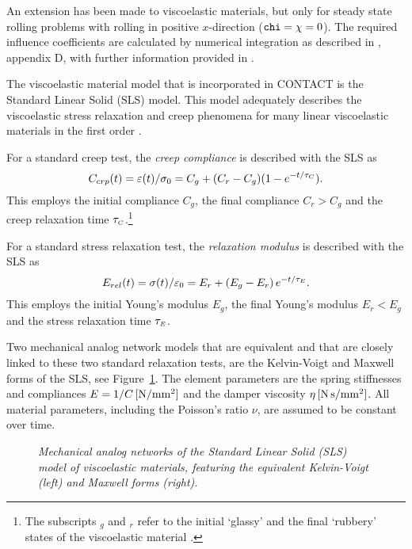 \documentclass[12pt]{report}
\begin{document}
An extension has been made to viscoelastic materials, but only for steady
state rolling problems with rolling in positive $x$-direction (${\tt chi}=
\chi=0$).  The required influence coefficients are calculated
by numerical integration as described in \cite{Kalker1990}, appendix D,
with further information provided in \cite{Wang_guangqiu1992b,
Wang_guangqiu1993}.

The viscoelastic material model that is incorporated in CONTACT is the
Standard Linear Solid (SLS) model. This model adequately describes the
viscoelastic stress relaxation and creep phenomena for many linear
viscoelastic materials in the first order \cite{Roylance2001}.

For a standard creep test, the {\em creep compliance\/} is described with
the SLS as
\begin{equation}
\label{eq:SLS_creep_compliance}
  C_{crp}(t) = \varepsilon(t)/\sigma_0 = C_g + (C_r-C_g) (1 - e^{-t/\tau_{\scriptscriptstyle C}}) .
\end{equation}
This employs the initial compliance $C_g$, the final compliance $C_r>C_g$
and the creep relaxation time $\tau_{\scriptscriptstyle C}$.\footnote{The subscripts $_g$ and
$_r$ refer to the initial `glassy' and the final `rubbery' states of
the viscoelastic material \cite{Roylance2001}.}

For a standard stress relaxation test, the {\em relaxation modulus\/} is
described with the SLS as
\begin{equation}
\label{eq:SLS_stress_relaxation}
  E_{rel}(t) = \sigma(t)/\varepsilon_0 = E_r + (E_g-E_r) \, e^{-t/\tau_{\scriptscriptstyle E}}.
\end{equation}
This employs the initial Young's modulus $E_g$, the final Young's modulus
$E_r<E_g$ and the stress relaxation time $\tau_{\scriptscriptstyle E}$. 

Two mechanical analog network models that are equivalent and that are
closely linked to these two standard relaxation tests, are the Kelvin-Voigt
and Maxwell forms of the SLS, see Figure~\ref{fig:sls_voigt_maxwell_models}.
The element parameters are the spring stiffnesses and compliances $E=1/C\,
[\mathrm{N/mm^2}]$ and the damper viscosity $\eta\,[\mathrm{N\,s/mm^2}]$.
All material parameters, including the Poisson's ratio $\nu$, are assumed
to be constant over time.

\begin{figure}[bt]
\centering
{}\hspace{15mm}
\caption{\em Mechanical analog networks of the Standard Linear Solid (SLS)
        model of viscoelastic materials, featuring the equivalent
        Kelvin-Voigt (left) and Maxwell forms (right).}
\label{fig:sls_voigt_maxwell_models}
\end{figure}
\end{document}
